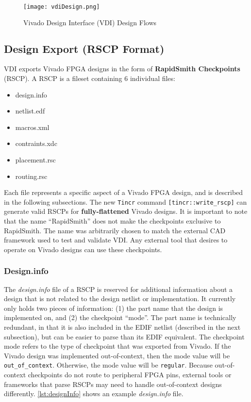 \begin{figure}[h!]
  \centering
  \texttt{[image: vdiDesign.png]}
  \caption{Vivado Design Interface (VDI) Design Flows}
  \label{fig:vdiDesign}
\end{figure}

\subsection{Design Export (RSCP Format)} \label{sec:vdiImport}
VDI exports Vivado FPGA designs in the form of \textbf{RapidSmith Checkpoints}
(RSCP). A RSCP is a fileset containing 6 individual files: 

\begin{multicols}{2}
	\begin {itemize}
	  \item design.info
	  \item netlist.edf
	  \item macros.xml
	  \item contraints.xdc
	  \item placement.rsc
	  \item routing.rsc
	\end{itemize}
\end{multicols}

\noindent Each file represents a specific aspect of a Vivado FPGA design, and
is described in the following subsections. The new \texttt{Tincr} command
\texttt{[tincr::write\_rscp]} can generate valid RSCPs for
\textbf{fully-flattened} Vivado designs. It is important to note that the name
``RapidSmith'' does not make the checkpoints exclusive to RapidSmith. The name
was arbitrarily chosen to match the external CAD framework used to test and
validate VDI. Any external tool that desires to operate on Vivado designs can
use these checkpoints.

\subsubsection{Design.info}
The \textit{design.info} file of a RSCP is reserved for additional information
about a design that is not related to the design netlist or implementation. It
currently only holds two pieces of information: (1) the part name that the
design is implemented on, and (2) the checkpoint ``mode''. The part name is
technically redundant, in that it is also included in the EDIF netlist
(described in the next subsection), but can be easier to parse than its EDIF equivalent. The
checkpoint mode refers to the type of checkpoint that was exported from Vivado.
If the Vivado design was implemented out-of-context, then the mode value will
be \texttt{out\_of\_context}. Otherwise, the mode value will be
\texttt{regular}. Because out-of-context checkpoints do not route to
peripheral FPGA pins, external tools or frameworks that parse RSCPs may need to
handle out-of-context designs differently. \autoref{lst:designInfo} shows an
example \textit{design.info} file. 

